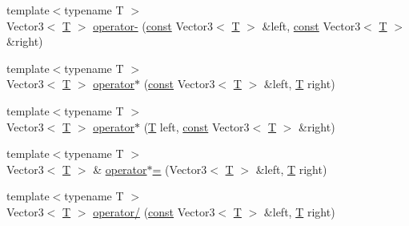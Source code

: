 \begin{DoxyCompactItemize}
\item 
{\footnotesize template$<$typename T $>$ }\\Vector3$<$ \hyperlink{curses_8priv_8h_a5ef253115820acf7d27f3c5c3b02a0f0}{T} $>$ \hyperlink{sfml_2dep_2_s_f_m_l-2_84_82_2include_2_s_f_m_l_2_system_2_vector3_8inl_a2bf8b0b55c1947527b6046e222221fae}{operator-\/} (\hyperlink{term__entry_8h_a57bd63ce7f9a353488880e3de6692d5a}{const} Vector3$<$ \hyperlink{curses_8priv_8h_a5ef253115820acf7d27f3c5c3b02a0f0}{T} $>$ \&left, \hyperlink{term__entry_8h_a57bd63ce7f9a353488880e3de6692d5a}{const} Vector3$<$ \hyperlink{curses_8priv_8h_a5ef253115820acf7d27f3c5c3b02a0f0}{T} $>$ \&right)
\item 
{\footnotesize template$<$typename T $>$ }\\Vector3$<$ \hyperlink{curses_8priv_8h_a5ef253115820acf7d27f3c5c3b02a0f0}{T} $>$ \hyperlink{sfml_2dep_2_s_f_m_l-2_84_82_2include_2_s_f_m_l_2_system_2_vector3_8inl_aeba70cd3aa71c62d1e9f16a057c9f7b5}{operator$\ast$} (\hyperlink{term__entry_8h_a57bd63ce7f9a353488880e3de6692d5a}{const} Vector3$<$ \hyperlink{curses_8priv_8h_a5ef253115820acf7d27f3c5c3b02a0f0}{T} $>$ \&left, \hyperlink{curses_8priv_8h_a5ef253115820acf7d27f3c5c3b02a0f0}{T} right)
\item 
{\footnotesize template$<$typename T $>$ }\\Vector3$<$ \hyperlink{curses_8priv_8h_a5ef253115820acf7d27f3c5c3b02a0f0}{T} $>$ \hyperlink{sfml_2dep_2_s_f_m_l-2_84_82_2include_2_s_f_m_l_2_system_2_vector3_8inl_a8c0523e9a31d09c76db9b2ef0c7faf8a}{operator$\ast$} (\hyperlink{curses_8priv_8h_a5ef253115820acf7d27f3c5c3b02a0f0}{T} left, \hyperlink{term__entry_8h_a57bd63ce7f9a353488880e3de6692d5a}{const} Vector3$<$ \hyperlink{curses_8priv_8h_a5ef253115820acf7d27f3c5c3b02a0f0}{T} $>$ \&right)
\item 
{\footnotesize template$<$typename T $>$ }\\Vector3$<$ \hyperlink{curses_8priv_8h_a5ef253115820acf7d27f3c5c3b02a0f0}{T} $>$ \& \hyperlink{sfml_2dep_2_s_f_m_l-2_84_82_2include_2_s_f_m_l_2_system_2_vector3_8inl_a07f8a600108d37efbbb202acbe736e08}{operator$\ast$=} (Vector3$<$ \hyperlink{curses_8priv_8h_a5ef253115820acf7d27f3c5c3b02a0f0}{T} $>$ \&left, \hyperlink{curses_8priv_8h_a5ef253115820acf7d27f3c5c3b02a0f0}{T} right)
\item 
{\footnotesize template$<$typename T $>$ }\\Vector3$<$ \hyperlink{curses_8priv_8h_a5ef253115820acf7d27f3c5c3b02a0f0}{T} $>$ \hyperlink{sfml_2dep_2_s_f_m_l-2_84_82_2include_2_s_f_m_l_2_system_2_vector3_8inl_a14c517aeedef370c1ba27bd1ac60e7d8}{operator/} (\hyperlink{term__entry_8h_a57bd63ce7f9a353488880e3de6692d5a}{const} Vector3$<$ \hyperlink{curses_8priv_8h_a5ef253115820acf7d27f3c5c3b02a0f0}{T} $>$ \&left, \hyperlink{curses_8priv_8h_a5ef253115820acf7d27f3c5c3b02a0f0}{T} right)

\end{DoxyCompactItemize}
